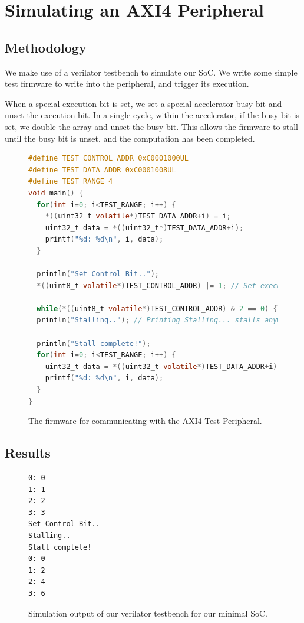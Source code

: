 \documentclass[a4paper,8pt]{report}
\begin{document}
\section{Simulating an AXI4 Peripheral}
\subsection{Methodology}
We make use of a verilator testbench to simulate our SoC. We write some simple
test firmware to write into the peripheral, and trigger its execution.

When a special execution bit is set, we set a special accelerator busy bit and
unset the execution bit. In a single cycle, within the accelerator, if the
busy bit is set, we double the array and unset the busy bit. This allows the
firmware to stall until the busy bit is unset, and the computation has been
completed.

\begin{figure}[h]
\begin{lstlisting}[language=C,style=customc]
#define TEST_CONTROL_ADDR 0xC0001000UL
#define TEST_DATA_ADDR 0xC0001008UL
#define TEST_RANGE 4
void main() {
  for(int i=0; i<TEST_RANGE; i++) {
    *((uint32_t volatile*)TEST_DATA_ADDR+i) = i;
    uint32_t data = *((uint32_t*)TEST_DATA_ADDR+i);
    printf("%d: %d\n", i, data);
  }

  println("Set Control Bit..");
  *((uint8_t volatile*)TEST_CONTROL_ADDR) |= 1; // Set execute!

  while(*((uint8_t volatile*)TEST_CONTROL_ADDR) & 2 == 0) {}
  println("Stalling.."); // Printing Stalling... stalls anyway...

  println("Stall complete!");
  for(int i=0; i<TEST_RANGE; i++) {
    uint32_t data = *((uint32_t volatile*)TEST_DATA_ADDR+i);
    printf("%d: %d\n", i, data);
  }
}
\end{lstlisting}
\caption{The firmware for communicating with the AXI4 Test Peripheral.}
\end{figure}

\subsection{Results}

\begin{figure}[h]
\centering
  \small
\begin{BVerbatim}
0: 0
1: 1
2: 2
3: 3
Set Control Bit..
Stalling..
Stall complete!
0: 0
1: 2
2: 4
3: 6
\end{BVerbatim}
\normalsize
\caption{Simulation output of our verilator testbench for our minimal SoC.}
\end{figure}
\end{document}
